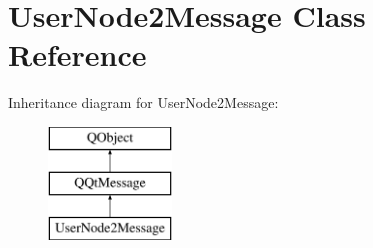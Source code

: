 \hypertarget{class_user_node2_message}{}\section{User\+Node2\+Message Class Reference}
\label{class_user_node2_message}
Inheritance diagram for User\+Node2\+Message\+:\begin{figure}[H]
\begin{center}
\leavevmode
\includegraphics[height=3.000000cm]{class_user_node2_message}
\end{center}
\end{figure}
